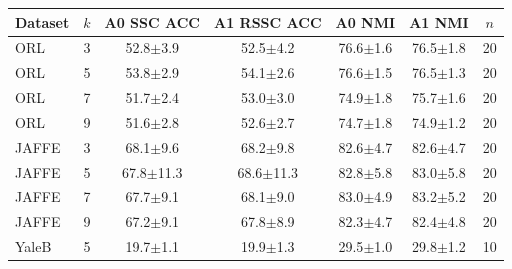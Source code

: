 \begin{tabular}{lcccccc}
\toprule
Dataset & $k$ & A0 SSC ACC & A1 RSSC ACC & A0 NMI & A1 NMI & $n$ \\
\midrule
ORL & 3 & 52.8$\pm$3.9 & 52.5$\pm$4.2 & 76.6$\pm$1.6 & 76.5$\pm$1.8 & 20 \\
ORL & 5 & 53.8$\pm$2.9 & 54.1$\pm$2.6 & 76.6$\pm$1.5 & 76.5$\pm$1.3 & 20 \\
ORL & 7 & 51.7$\pm$2.4 & 53.0$\pm$3.0 & 74.9$\pm$1.8 & 75.7$\pm$1.6 & 20 \\
ORL & 9 & 51.6$\pm$2.8 & 52.6$\pm$2.7 & 74.7$\pm$1.8 & 74.9$\pm$1.2 & 20 \\
JAFFE & 3 & 68.1$\pm$9.6 & 68.2$\pm$9.8 & 82.6$\pm$4.7 & 82.6$\pm$4.7 & 20 \\
JAFFE & 5 & 67.8$\pm$11.3 & 68.6$\pm$11.3 & 82.8$\pm$5.8 & 83.0$\pm$5.8 & 20 \\
JAFFE & 7 & 67.7$\pm$9.1 & 68.1$\pm$9.0 & 83.0$\pm$4.9 & 83.2$\pm$5.2 & 20 \\
JAFFE & 9 & 67.2$\pm$9.1 & 67.8$\pm$8.9 & 82.3$\pm$4.7 & 82.4$\pm$4.8 & 20 \\
YaleB & 5 & 19.7$\pm$1.1 & 19.9$\pm$1.3 & 29.5$\pm$1.0 & 29.8$\pm$1.2 & 10 \\
\bottomrule
\end{tabular}
